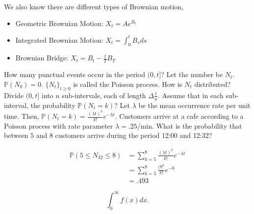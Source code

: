 \documentclass[12pt]{article}
\newcommand{\prob}[1]{\mathbb{P}(#1)}
\begin{document}
\noindent
We also know there are different types of Brownian motion,

\begin{itemize}
\item Geometric Brownian Motion: $X_t = A e^{B_t}$
\item Integrated Brownian Motion: $X_t = \int_{0}^{t} B_s ds$
\item Brownian Bridge: $X_t = B_t - \frac{t}{T} B_T$
\end{itemize}

How many punctual events occur in the period $(0, t]$? Let the number be $N_t$. $\prob{N_0} = 0$. $\{ N_t \}_{t \geq 0}$ is called the Poisson process. How is $N_t$ distributed? Divide $(0, t]$ into $n$ sub-intervals, each of length $\Delta \frac{t}{n}$. Assume that in each sub-interval, the probability $\prob{N_t = k}$? Let $\lambda$ be the mean occurrence rate per unit time. Then, $\prob{N_t = k} = \frac{(\lambda t)^k}{k!} e^{- \lambda t}$. Customers arrive at a cafe according to a Poisson process with rate parameter $\lambda = .25$/min. What is the probability that between $5$ and $8$ customers arrive during the period 12:00 and 12:32? 

\begin{align*}
\prob{5 \leq N_{32} \leq 8} &= \sum_{k=5}^{8} \frac{(\lambda t)^k}{k!} e^{- \lambda t} \\
&= \sum_{k=5}^{8} \frac{(8^k}{k!} e^{- 8} \\
&= .493
\end{align*}


\begin{equation*}
\int_0^{\infty} f(x) dx.
\end{equation*}
\end{document}
